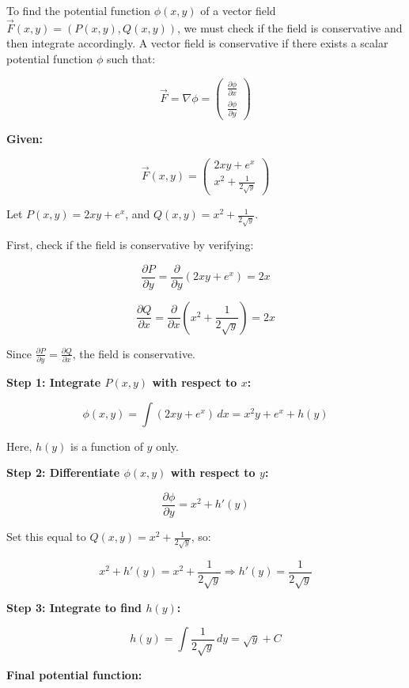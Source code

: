 To find the potential function \( \phi(x, y) \) of a vector field \( \vec{F}(x, y) = (P(x, y), Q(x, y)) \), 
we must check if the field is conservative and then integrate accordingly. A vector field is conservative 
if there exists a scalar potential function \( \phi \) such that:

\[
    \vec{F} = \nabla \phi = 
    \begin{pmatrix}
        \frac{\partial \phi}{\partial x} \\ 
        \frac{\partial \phi}{\partial y}
    \end{pmatrix} 
\]

\textbf{Given:}

\[
    \vec{F}(x, y) = 
    \begin{pmatrix}
    2xy + e^x \\
    x^2 + \frac{1}{2\sqrt{y}}
    \end{pmatrix}
\]

Let \( P(x, y) = 2xy + e^x \), and \( Q(x, y) = x^2 + \frac{1}{2\sqrt{y}} \).

First, check if the field is conservative by verifying:

\[
    \frac{\partial P}{\partial y} = \frac{\partial}{\partial y}(2xy + e^x) = 2x
\]

\[
    \frac{\partial Q}{\partial x} = \frac{\partial}{\partial x}\left(x^2 + \frac{1}{2\sqrt{y}}\right) 
    = 2x
\]

Since \( \frac{\partial P}{\partial y} = \frac{\partial Q}{\partial x} \), the field is conservative.

\textbf{Step 1: Integrate \( P(x, y) \) with respect to \(x\):}

\[
    \phi(x, y) = \int (2xy + e^x)\,dx = x^2y + e^x + h(y)
\]

Here, \( h(y) \) is a function of \(y\) only.

\textbf{Step 2: Differentiate \( \phi(x, y) \) with respect to \(y\):}

\[
    \frac{\partial \phi}{\partial y} = x^2 + h'(y)
\]

Set this equal to \( Q(x, y) = x^2 + \frac{1}{2\sqrt{y}} \), so:

\[
    x^2 + h'(y) = x^2 + \frac{1}{2\sqrt{y}} \Rightarrow h'(y) = \frac{1}{2\sqrt{y}}
\]

\textbf{Step 3: Integrate to find \( h(y) \):}

\[
    h(y) = \int \frac{1}{2\sqrt{y}}\,dy = \sqrt{y} + C
\]

\textbf{Final potential function:}

